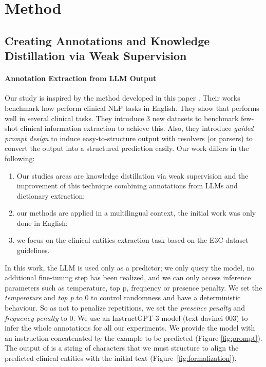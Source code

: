 \section{Method}

\subsection{Creating Annotations and Knowledge Distillation via Weak Supervision}
\paragraph{Annotation Extraction from LLM Output}
Our study is inspired by the method developed in this paper \citep{Agrawal2022LargeExtractors}. Their works benchmark how \instruct \citep{Ouyang2022TrainingFeedback} perform clinical NLP tasks in English. They show that \instruct performs well in several clinical tasks. They introduce 3 new datasets to benchmark few-shot clinical information extraction to achieve this. Also, they introduce \textit{guided prompt design} to induce easy-to-structure output with resolvers (or parsers) to convert the output into a structured prediction easily. 
Our work differs in the following: 
\begin{enumerate}
    \item Our studies areas are knowledge distillation via weak supervision and the improvement of this technique combining annotations from LLMs and dictionary extraction;
    \item our methods are applied in a multilingual context, the initial work was only done in English;
    \item we focus on the clinical entities extraction task based on the E3C dataset guidelines.
\end{enumerate}


In this work, the LLM is used only as a predictor; we only query the model, no additional fine-tuning step has been realized, and we can only access inference parameters such as temperature, top p, frequency or presence penalty. We set the \textit{temperature} and \textit{top p} to 0 to control randomness and have a deterministic behaviour. So as not to penalize repetitions, we set the \textit{presence penalty} and \textit{frequency penalty} to 0. We use an InstructGPT-3 model (text-davinci-003) \citep{Ouyang2022TrainingFeedback} to infer the whole annotations for all our experiments.
We provide the model with an instruction concatenated by the example to be predicted (Figure \ref{fig:prompt}). The output of \instruct is a string of characters that we must structure to align the predicted clinical entities with the initial text (Figure~\ref{fig:formalization}).

